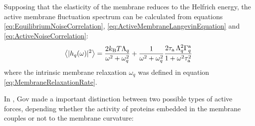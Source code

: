 \documentclass[graybox]{svmult}
\begin{document}
Supposing that the elasticity of the membrane reduces to the Helfrich energy, the active membrane fluctuation spectrum can be calculated from equations \eqref{eq:EquilibriumNoiseCorrelation}, \eqref{eq:ActiveMembraneLangevinEquation} and \eqref{eq:ActiveNoiseCorrelation}:
\begin{equation}
\label{eq:ActiveFluctuationSpectrum}
\left\langle |h_q(\omega)|^2\right\rangle = \frac{2k_{\rm{B}}T\Lambda_q}{\omega^2 + \omega_q^2} + \frac{1}{\omega^2 + \omega_q^2}\frac{2\tau_{\rm{a}}\,\Lambda_q^2\Gamma_{q}^{\rm{a}}}{1+\omega^2\tau_{\rm{a}}^2}
\end{equation}
where the intrinsic membrane relaxation $\omega_{q}$ was defined in equation \eqref{eq:MembraneRelaxationRate}.

In \cite{Gov:2004}, Gov made a important distinction between two possible types of active forces, depending whether the  activity of proteins embedded in the membrane couples or not to the membrane curvature: 
\end{document}
